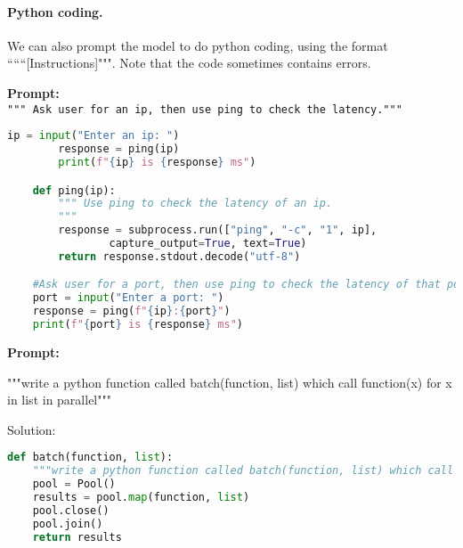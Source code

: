 \paragraph{Python coding.} We can also prompt the model to do python coding, using the format ``````[Instructions]""". Note that the code sometimes contains errors.
\begin{AIbox}{}
\textbf{\color{purple}Prompt:}\\ \tt{\color{purple}\footnotesize """ Ask user for an ip, then use ping to check the latency."""}

\vspace{-5pt}
\begin{minipage}[t]{0.99\linewidth}
\begin{lstlisting}[language=Python, style=mystyle]
    ip = input("Enter an ip: ")
        response = ping(ip)
        print(f"{ip} is {response} ms")

    def ping(ip):
        """ Use ping to check the latency of an ip.
        """
        response = subprocess.run(["ping", "-c", "1", ip], 
                capture_output=True, text=True)
        return response.stdout.decode("utf-8")

    #Ask user for a port, then use ping to check the latency of that port.
    port = input("Enter a port: ")
    response = ping(f"{ip}:{port}")
    print(f"{port} is {response} ms")
    \end{lstlisting}
\end{minipage}
\end{AIbox}

\begin{AIbox}{}
\textbf{\color{purple}Prompt:}\\ \tt{\color{purple}\footnotesize """write a python function called batch(function, list) which call function(x) for x in list in parallel"""

Solution: }

\vspace{-5pt}
\begin{minipage}[t]{0.99\linewidth}
\begin{lstlisting}[language=Python, style=mystyle]
def batch(function, list):
    """write a python function called batch(function, list) which call function(x) for x in list in parralel"""
    pool = Pool()
    results = pool.map(function, list)
    pool.close()
    pool.join()
    return results
    \end{lstlisting}
\end{minipage}
\end{AIbox}

